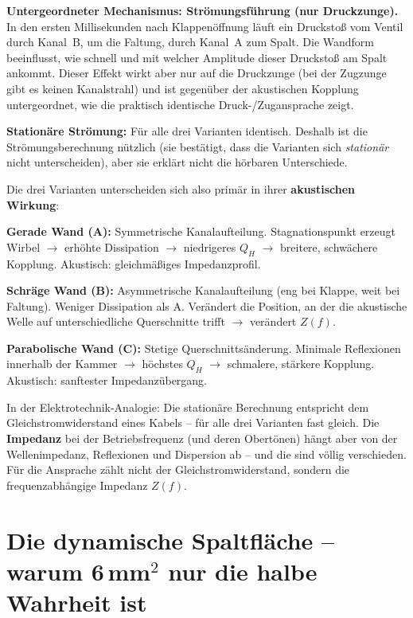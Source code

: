 \documentclass[11pt,a4paper]{article}
\begin{document}
\textbf{Untergeordneter Mechanismus: Strömungsführung (nur Druckzunge).} In den ersten Millisekunden nach Klappenöffnung läuft ein Druckstoß vom Ventil durch Kanal~B, um die Faltung, durch Kanal~A zum Spalt. Die Wandform beeinflusst, wie schnell und mit welcher Amplitude dieser Druckstoß am Spalt ankommt. Dieser Effekt wirkt aber nur auf die Druckzunge (bei der Zugzunge gibt es keinen Kanalstrahl) und ist gegenüber der akustischen Kopplung untergeordnet, wie die praktisch identische Druck-/Zugansprache zeigt.

\textbf{Stationäre Strömung:} Für alle drei Varianten identisch. Deshalb ist die Strömungsberechnung nützlich (sie bestätigt, dass die Varianten sich \textit{stationär} nicht unterscheiden), aber sie erklärt nicht die hörbaren Unterschiede.

Die drei Varianten unterscheiden sich also primär in ihrer \textbf{akustischen Wirkung}:

\textbf{Gerade Wand (A):} Symmetrische Kanalaufteilung. Stagnationspunkt erzeugt Wirbel $\to$ erhöhte Dissipation $\to$ niedrigeres $Q_H$ $\to$ breitere, schwächere Kopplung. Akustisch: gleichmäßiges Impedanzprofil.

\textbf{Schräge Wand (B):} Asymmetrische Kanalaufteilung (eng bei Klappe, weit bei Faltung). Weniger Dissipation als A. Verändert die Position, an der die akustische Welle auf unterschiedliche Querschnitte trifft $\to$ verändert $Z(f)$.

\textbf{Parabolische Wand (C):} Stetige Querschnittsänderung. Minimale Reflexionen innerhalb der Kammer $\to$ höchstes $Q_H$ $\to$ schmalere, stärkere Kopplung. Akustisch: sanftester Impedanzübergang.

In der Elektrotechnik-Analogie: Die stationäre Berechnung entspricht dem Gleichstromwiderstand eines Kabels -- für alle drei Varianten fast gleich. Die \textbf{Impedanz} bei der Betriebsfrequenz (und deren Obertönen) hängt aber von der Wellenimpedanz, Reflexionen und Dispersion ab -- und die sind völlig verschieden. Für die Ansprache zählt nicht der Gleichstromwiderstand, sondern die frequenzabhängige Impedanz $Z(f)$.

\section[Dynamische Spaltfläche]{Die dynamische Spaltfläche -- warum 6\,mm$^2$ nur die halbe Wahrheit ist}
\end{document}
